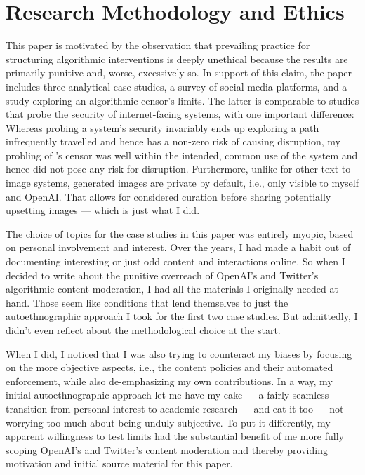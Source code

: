 
\newpage
\section{Research Methodology and Ethics}
\label{adx:research-ethics}

This paper is motivated by the observation that prevailing practice for
structuring algorithmic interventions is deeply unethical because the results
are primarily punitive and, worse, excessively so. In support of this claim, the
paper includes three analytical case studies, a survey of social media
platforms, and a study exploring an algorithmic censor's limits. The latter is
comparable to studies that probe the security of internet-facing systems, with
one important difference: Whereas probing a system's security invariably ends up
exploring a path infrequently travelled and hence has a non-zero risk of causing
disruption, my probling of \dalle's censor was well within the intended, common
use of the system and hence did not pose any risk for disruption. Furthermore,
unlike for other text-to-image systems, generated images are private by default,
i.e., only visible to myself and OpenAI. That allows for considered curation
before sharing potentially upsetting images --- which is just what I did.

The choice of topics for the case studies in this paper was entirely myopic,
based on personal involvement and interest. Over the years, I had made a habit
out of documenting interesting or just odd content and interactions online. So
when I decided to write about the punitive overreach of OpenAI's and Twitter's
algorithmic content moderation, I had all the materials I originally needed at
hand. Those seem like conditions that lend themselves to just the
autoethnographic approach I took for the first two case studies. But admittedly,
I didn't even reflect about the methodological choice at the start.

When I did, I noticed that I was also trying to counteract my biases by focusing
on the more objective aspects, i.e., the content policies and their automated
enforcement, while also de-emphasizing my own contributions. In a way, my
initial autoethnographic approach let me have my cake --- a fairly seamless
transition from personal interest to academic research --- and eat it too ---
not worrying too much about being unduly subjective. To put it differently, my
apparent willingness to test limits had the substantial benefit of me more fully
scoping OpenAI's and Twitter's content moderation and thereby providing
motivation and initial source material for this paper.

